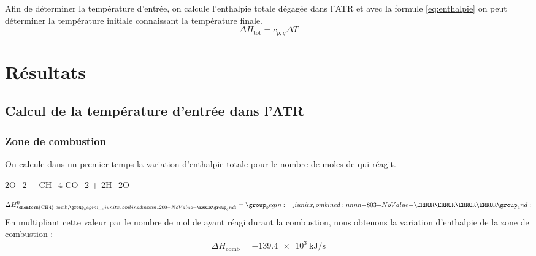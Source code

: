 \documentclass[french, a4paper, 10pt]{article}
\begin{document}

Afin de déterminer la température d'entrée, on calcule l'enthalpie totale dégagée dans l'ATR et avec la formule \ref{eq:enthalpie} on peut déterminer la température initiale connaissant la température finale. 
\begin{equation}
	\Delta H_\text{tot} = c_{p,g}\Delta T
	\label{eq:enthalpie}
\end{equation}

\section{Résultats}
\subsection{Calcul de la température d'entrée dans l'ATR}
\subsubsection*{Zone de combustion}
On calcule dans un premier temps la variation d'enthalpie totale pour le nombre de moles de  qui réagit.
\begin{chemmath}
	2O_2 + CH_4 \longrightarrow CO_2 + 2H_2O
\end{chemmath}
\begin{equation*}\Delta H^0_{\text{\chemform{CH4},comb},\SI{1200}{\kelvin}} = \SI{-803}{\kilo\joule\per\mol}\end{equation*}
En multipliant cette valeur par le nombre de mol de  ayant réagi durant la combustion, nous obtenons la variation d'enthalpie de la zone de combustion :
\begin{equation}\Delta\dot{H}_\text{comb} = \SI{-139.4e3}{\kilo\joule\per\second}\end{equation}
\end{document}
